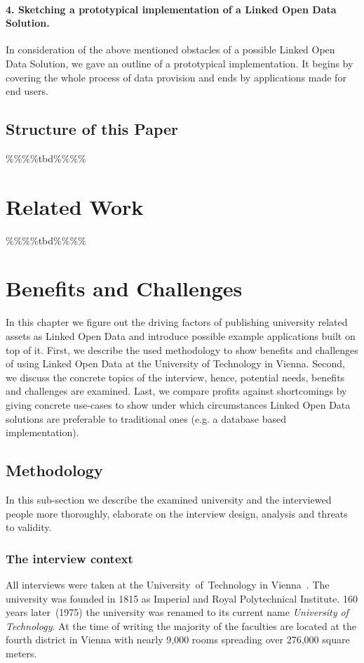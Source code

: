 \documentclass{article}
\begin{document}
\paragraph{4. Sketching a prototypical implementation of a Linked Open Data Solution.}
In consideration of the above mentioned obstacles of a possible Linked Open Data Solution, we gave an outline of a prototypical implementation. It begins by covering the whole process of data provision and ends by applications made for end users. 
\subsection{Structure of this Paper}
\%\%\%\%tbd\%\%\%\%

\section{Related Work}
\%\%\%\%tbd\%\%\%\%
\section{Benefits and Challenges}
In this chapter we figure out the driving factors of publishing university related assets as Linked Open Data and introduce possible example applications built on top of it. First, we describe the used methodology to show benefits and challenges of using Linked Open Data at the University of Technology in Vienna. Second, we discuss the concrete topics of the interview, hence, potential needs, benefits and challenges are examined. Last, we compare profits against shortcomings by giving concrete use-cases to show under which circumstances Linked Open Data solutions are preferable to traditional ones (e.g. a database based implementation). 
\subsection{Methodology}
In this sub-section we describe the examined university and the interviewed people more thoroughly, elaborate on the interview design, analysis and threats to validity.
\subsubsection{The interview context}
All interviews were taken at the University~of~Technology in Vienna~\cite{url:university-of-technology-vienna}. The university was founded in 1815 as Imperial and Royal Polytechnical Institute. 160 years later~(1975) the university was renamed to its current name \textit{University of Technology}. At the time of writing the majority of the faculties are located at the fourth district in Vienna with nearly 9,000 rooms spreading over 276,000 square meters.
\end{document}
